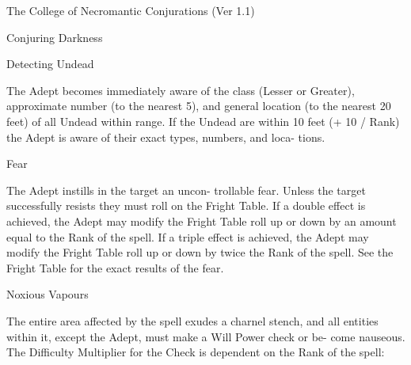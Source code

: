 \begin{Chapter}{The College of Necromantic Conjurations (Ver 1.1)}
\begin{spell}[G-3]{Conjuring Darkness }
\begin{effects}
\end{effects}
\end{spell}

\begin{spell}[G-4]{Detecting Undead }

\begin{effects}
The Adept becomes immediately aware of 
the  class (Lesser  or  Greater),  approximate  number 
(to  the  nearest  5),  and  general  location  (to  the 
nearest  20  feet)  of  all  Undead  within  range.  If  the 
Undead are within 10 feet (+ 10 / Rank) the Adept 
is  aware  of  their  exact  types,  numbers,  and  loca-
tions. 

\end{effects}
\end{spell}

\begin{spell}[G-5]{Fear }

\begin{effects}
 The  Adept  instills  in  the  target  an  uncon-
trollable fear. Unless the target successfully resists 
they  must  roll  on  the  Fright  Table.  If  a  double 
effect  is  achieved,  the  Adept  may  modify  the 
Fright Table roll up or down by an amount equal to 
the Rank of the spell. If a triple effect is achieved, 
the  Adept  may  modify  the  Fright  Table  roll  up  or 
down by twice the Rank of the spell. See the Fright 
Table for the exact results of the fear. 

\end{effects}
\end{spell}

\begin{spell}[G-6]{Noxious Vapours }

\begin{effects}
The entire area affected by the spell exudes 
a  charnel  stench,  and  all  entities  within  it,  except 
the  Adept,  must  make  a  Will  Power  check  or  be-
come  nauseous.  The  Difficulty  Multiplier  for  the 
Check is dependent on the Rank of the spell: 


\end{effects}
\end{spell}
\end{Chapter}
